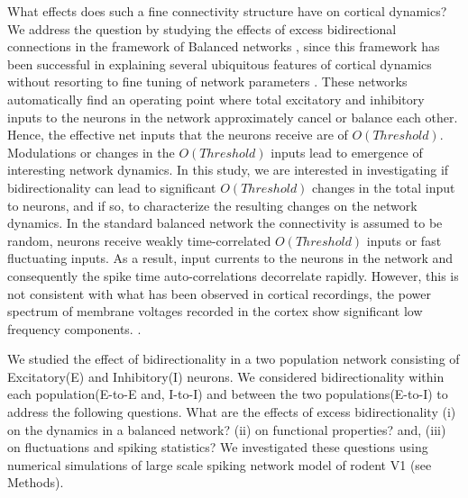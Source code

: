 What effects does such a fine connectivity structure have on cortical dynamics? We address the question by studying the effects of excess bidirectional connections in the framework of Balanced networks \cite{carl1996, carl1998, carl2004}, since this framework has been successful in explaining several ubiquitous features of cortical dynamics without resorting to fine tuning of network parameters \cite{softky1993, Holt1996, roxin2011}. These networks automatically find an operating point where total excitatory and inhibitory inputs to the neurons in the network approximately cancel or balance each other.  Hence, the effective net inputs that the neurons receive are of $O(Threshold)$. Modulations or changes in the $O(Threshold)$ inputs lead to emergence of interesting network dynamics. In this study, we are interested in investigating if bidirectionality can lead to significant $O(Threshold)$ changes in the total input to neurons, and if so, to characterize the resulting changes on the network dynamics. In the standard balanced network the connectivity is assumed to be random, neurons receive weakly time-correlated $O(Threshold)$ inputs or fast fluctuating inputs. As a result, input currents to the neurons in the network and consequently the spike time auto-correlations decorrelate rapidly\cite{carl1996, carl1998}. However, this is not consistent with what has been observed in cortical recordings, the power spectrum of membrane voltages recorded in the cortex show significant low frequency components. \cite{Tan2014}.	
	
We studied the effect of bidirectionality in a two population network consisting of Excitatory(E) and Inhibitory(I) neurons. We considered bidirectionality within each population(E-to-E and, I-to-I) and between the two populations(E-to-I) to address the following questions. What are the effects of excess bidirectionality (i) on the dynamics in a balanced network? (ii) on functional properties? and, (iii) on fluctuations and spiking statistics? We investigated these questions using numerical simulations of large scale spiking network  model of rodent V1 (see Methods). \\
